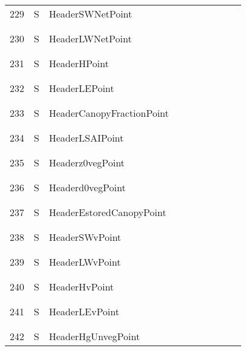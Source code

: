 \begin{longtable}{|c|c|l|c|c|c|c|p{}|c|p{}|}
229 & S & HeaderSWNetPoint & & & & & & & \\
&&&&&&&&&\\\hline%
&&&&&&&&&\\
230 & S & HeaderLWNetPoint & & & & & & & \\
&&&&&&&&&\\\hline%
&&&&&&&&&\\
231 & S & HeaderHPoint & & & & & & & \\
&&&&&&&&&\\\hline%
&&&&&&&&&\\
232 & S & HeaderLEPoint & & & & & & & \\
&&&&&&&&&\\\hline%
&&&&&&&&&\\
233 & S & HeaderCanopyFractionPoint & & & & & & & \\
&&&&&&&&&\\\hline%
&&&&&&&&&\\
234 & S & HeaderLSAIPoint & & & & & & & \\
&&&&&&&&&\\\hline%
&&&&&&&&&\\
235 & S & Headerz0vegPoint & & & & & & & \\
&&&&&&&&&\\\hline%
&&&&&&&&&\\
236 & S & Headerd0vegPoint & & & & & & & \\
&&&&&&&&&\\\hline%
&&&&&&&&&\\
237 & S & HeaderEstoredCanopyPoint & & & & & & & \\
&&&&&&&&&\\\hline%
&&&&&&&&&\\
238 & S & HeaderSWvPoint & & & & & & & \\
&&&&&&&&&\\\hline%
&&&&&&&&&\\
239 & S & HeaderLWvPoint & & & & & & & \\
&&&&&&&&&\\\hline%
&&&&&&&&&\\
240 & S & HeaderHvPoint & & & & & & & \\
&&&&&&&&&\\\hline%
&&&&&&&&&\\
241 & S & HeaderLEvPoint & & & & & & & \\
&&&&&&&&&\\\hline%
&&&&&&&&&\\
242 & S & HeaderHgUnvegPoint & & & & & & & \\

\end{longtable}
